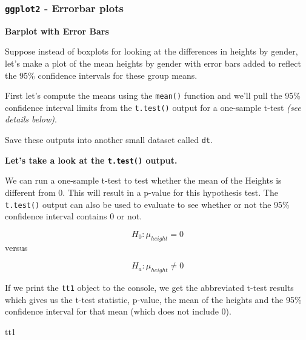 \documentclass[
  letterpaper,
  DIV=11,
  numbers=noendperiod]{scrartcl}
\newenvironment{Shaded}{\begin{snugshade}}{\end{snugshade}}
\newcommand{\AttributeTok}[1]{\textcolor[rgb]{0.40,0.45,0.13}{#1}}
\newcommand{\CommentTok}[1]{\textcolor[rgb]{0.37,0.37,0.37}{#1}}
\newcommand{\FloatTok}[1]{\textcolor[rgb]{0.68,0.00,0.00}{#1}}
\newcommand{\FunctionTok}[1]{\textcolor[rgb]{0.28,0.35,0.67}{#1}}
\newcommand{\NormalTok}[1]{\textcolor[rgb]{0.00,0.23,0.31}{#1}}
\newcommand{\OtherTok}[1]{\textcolor[rgb]{0.00,0.23,0.31}{#1}}
\newcommand{\SpecialCharTok}[1]{\textcolor[rgb]{0.37,0.37,0.37}{#1}}
\begin{document}
\newpage

\subsubsection{\texorpdfstring{\texttt{ggplot2} - Errorbar
plots}{ggplot2 - Errorbar plots}}\label{ggplot2---errorbar-plots}

\textbf{Barplot with Error Bars}

Suppose instead of boxplots for looking at the differences in heights by
gender, let's make a plot of the mean heights by gender with error bars
added to reflect the 95\% confidence intervals for these group means.

First let's compute the means using the \texttt{mean()} function and
we'll pull the 95\% confidence interval limits from the
\texttt{t.test()} output for a one-sample t-test \emph{(see details
below)}.

Save these outputs into another small dataset called \texttt{dt}.

\textbf{Let's take a look at the \texttt{t.test()} output.}

We can run a one-sample t-test to test whether the mean of the Heights
is different from 0. This will result in a p-value for this hypothesis
test. The \texttt{t.test()} output can also be used to evaluate to see
whether or not the 95\% confidence interval contains 0 or not.

\[H_0: \mu_{height} = 0\] versus

\[H_a: \mu_{height} \neq 0\]

\begin{Shaded}
\end{Shaded}

If we print the \texttt{tt1} object to the console, we get the
abbreviated t-test results which gives us the t-test statistic, p-value,
the mean of the heights and the 95\% confidence interval for that mean
(which does not include 0).

\begin{Shaded}
\begin{Highlighting}[]
\NormalTok{tt1}
\end{Highlighting}
\end{Shaded}
\end{document}
